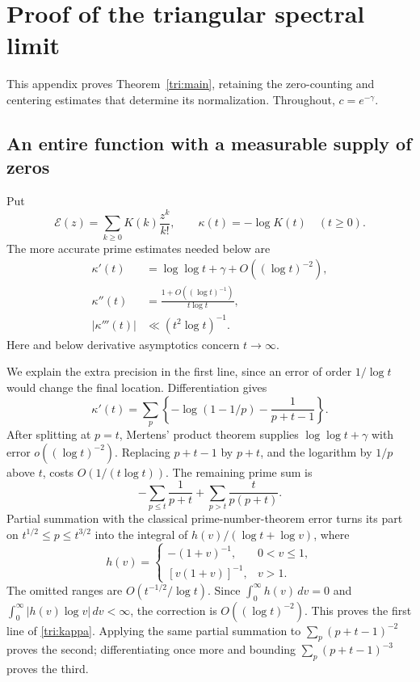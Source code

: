 \section{Proof of the triangular spectral limit}\label{triapp:all}
This appendix proves Theorem~\ref{tri:main}, retaining the zero-counting
and centering estimates that determine its normalization.
Throughout, $c=e^{-\gamma}$.
\subsection{An entire function with a measurable supply of zeros}
Put
\[
 \mathcal E(z)=\sum_{k\ge0}K(k)\frac{z^k}{k!},\qquad
 \kappa(t)=-\log K(t)\quad(t\ge0).
\]
The more accurate prime estimates needed below are
\begin{equation}\label{tri:kappa}
 \begin{split}
 \kappa'(t)&=\log\log t+\gamma+O((\log t)^{-2}),\\
 \kappa''(t)&=\frac{1+O((\log t)^{-1})}{t\log t},\\
 |\kappa'''(t)|&\ll(t^2\log t)^{-1}.
 \end{split}
\end{equation}
Here and below derivative asymptotics concern $t\to\infty$.

We explain the extra precision in the first line, since an error of
order $1/\log t$ would change the final location.  Differentiation
gives
\[
 \kappa'(t)=\sum_p\left\{-\log(1-1/p)-\frac1{p+t-1}\right\}.
\]
After splitting at $p=t$, Mertens' product theorem supplies
$\log\log t+\gamma$ with error $o((\log t)^{-2})$.
Replacing $p+t-1$ by $p+t$, and the logarithm by $1/p$ above $t$,
costs $O(1/(t\log t))$.  The remaining prime sum is
\[
 -\sum_{p\le t}\frac1{p+t}
       +\sum_{p>t}\frac{t}{p(p+t)}.
\]
Partial summation with the classical prime-number-theorem error
turns its part on $t^{1/2}\le p\le t^{3/2}$ into the integral
of $h(v)/(\log t+\log v)$, where
\[
 h(v)=
 \begin{cases}
 -(1+v)^{-1},&0<v\le1,\\
 [v(1+v)]^{-1},&v>1.
 \end{cases}
\]
The omitted ranges are $O(t^{-1/2}/\log t)$.
Since $\int_0^\infty h(v)\,dv=0$ and
$\int_0^\infty |h(v)\log v|\,dv<\infty$, the correction is
$O((\log t)^{-2})$.  This proves the first line of
\eqref{tri:kappa}.  Applying the same partial summation to
$\sum_p(p+t-1)^{-2}$ proves the second; differentiating once more
and bounding $\sum_p(p+t-1)^{-3}$ proves the third.

